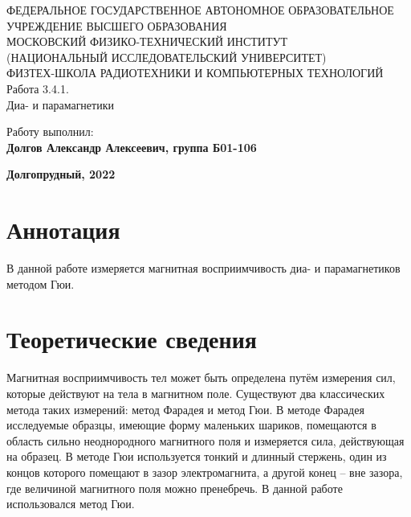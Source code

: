 \documentclass[15pt,a5paper,reqno]{article}
\begin{document}
\begin{center}
  {\small ФЕДЕРАЛЬНОЕ ГОСУДАРСТВЕННОЕ АВТОНОМНОЕ ОБРАЗОВАТЕЛЬНОЕ\\ УЧРЕЖДЕНИЕ ВЫСШЕГО ОБРАЗОВАНИЯ\\ МОСКОВСКИЙ ФИЗИКО-ТЕХНИЧЕСКИЙ ИНСТИТУТ\\ (НАЦИОНАЛЬНЫЙ ИССЛЕДОВАТЕЛЬСКИЙ УНИВЕРСИТЕТ)\\ ФИЗТЕХ-ШКОЛА РАДИОТЕХНИКИ И КОМПЬЮТЕРНЫХ ТЕХНОЛОГИЙ}\\
  \hfill \break
  \hfill \break
  \hfill \break
  \Huge{Работа 3.4.1. \\ Диа- и парамагнетики}\\
\end{center}

\hfill \break
\hfill \break
\hfill \break
\hfill \break
\hfill \break
\hfill \break
\hfill \break
\hfill \break

\begin{flushright}
  \normalsize{Работу выполнил:}\\
  \normalsize{\textbf{Долгов Александр Алексеевич, группа Б01-106}}\\
\end{flushright}

\begin{center}
  \normalsize{\textbf{Долгопрудный, 2022}}
\end{center}

\thispagestyle{empty} %


\newpage
\thispagestyle{plain}
\tableofcontents
\thispagestyle{plain}
\newpage

\section{Аннотация}

    В данной работе измеряется магнитная восприимчивость диа- и парамагнетиков методом Гюи.
	
\section{Теоретические сведения}

    Магнитная восприимчивость тел может быть определена путём измерения сил, которые действуют на тела в магнитном поле. Существуют два классических метода таких измерений: метод Фарадея и метод Гюи. В методе Фарадея исследуемые образцы, имеющие форму маленьких шариков, помещаются в область сильно неоднородного магнитного поля и измеряется сила, действующая на образец. В методе Гюи используется тонкий и длинный стержень, один из концов которого помещают в зазор электромагнита, а другой конец -- вне зазора, где величиной магнитного поля можно пренебречь. В данной работе использовался метод Гюи.
\end{document}
